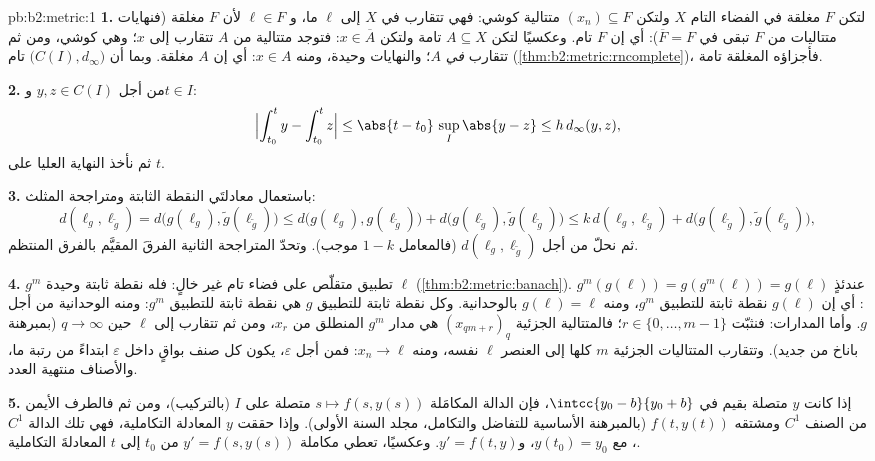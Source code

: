 \begin{solution}{pb:b2:metric:1}
\textbf{1.} لتكن $F$ مغلقة في الفضاء التام $X$ ولتكن $(x_n)
\subseteq F$ متتالية كوشي: فهي تتقارب في $X$ إلى $\ell$ ما، و
$\ell \in F$ لأن $F$ مغلقة (فنهايات متتاليات من $F$
تبقى في $\overline F = F$): أي إن $F$ تام. وعكسيًا لتكن $A
\subseteq X$ تامة ولتكن $x \in \overline A$: فتوجد متتالية
من $A$ تتقارب إلى $x$؛ وهي كوشي، ومن ثم تتقارب \emph{في}
$A$؛ والنهايات وحيدة، ومنه $x \in A$: أي إن $A$ مغلقة. وبما أن
$\bigl(C(I), d_\infty\bigr)$ تام
(\cref{thm:b2:metric:rncomplete})، فأجزاؤه المغلقة
تامة.

\textbf{2.} من أجل $y, z \in C(I)$ و$t \in I$:
\[
\Bigl|\int_{t_0}^{t}y - \int_{t_0}^{t}z\Bigr| \leq
\abs{t - t_0}\,\sup_I\abs{y - z} \leq h\,d_\infty(y, z),
\]
ثم نأخذ النهاية العليا على $t$.

\textbf{3.} باستعمال معادلتَي النقطة الثابتة ومتراجحة
المثلث:
\[
d(\ell_g, \ell_{\widetilde g})
= d\bigl(g(\ell_g), \widetilde g(\ell_{\widetilde g})\bigr)
\leq d\bigl(g(\ell_g), g(\ell_{\widetilde g})\bigr) +
d\bigl(g(\ell_{\widetilde g}), \widetilde g(\ell_{\widetilde
g})\bigr)
\leq k\,d(\ell_g, \ell_{\widetilde g}) +
d\bigl(g(\ell_{\widetilde g}), \widetilde g(\ell_{\widetilde
g})\bigr),
\]
ثم نحلّ من أجل $d(\ell_g, \ell_{\widetilde g})$ (فالمعامل
$1 - k$ موجب). وتحدّ المتراجحة الثانية الفرقَ المقيَّم
بالفرق المنتظم.

\textbf{4.} $g^m$ تطبيق متقلّص على فضاء تام غير خالٍ:
فله نقطة ثابتة وحيدة $\ell$
(\cref{thm:b2:metric:banach}). عندئذٍ $g^m(g(\ell)) =
g(g^m(\ell)) = g(\ell)$: أي إن $g(\ell)$ نقطة ثابتة للتطبيق $g^m$،
ومنه $g(\ell) = \ell$ بالوحدانية. وكل نقطة ثابتة للتطبيق $g$ هي نقطة ثابتة
للتطبيق $g^m$: ومنه الوحدانية من أجل $g$. وأما المدارات: فنثبّت $r \in \{0, \dots,
m-1\}$؛ فالمتتالية الجزئية $(x_{qm + r})_q$ هي مدار $g^m$
المنطلق من $x_r$، ومن ثم تتقارب إلى $\ell$ حين $q \to \infty$
(بمبرهنة باناخ من جديد). وتتقارب المتتاليات الجزئية $m$ كلها إلى العنصر
$\ell$ نفسه، ومنه $x_n \to \ell$: فمن أجل $\varepsilon$، يكون كل صنف بواقٍ
داخل $\varepsilon$ ابتداءً من رتبة ما، والأصناف منتهية
العدد.

\textbf{5.} إذا كانت $y$ متصلة بقيم في $\intcc{y_0 -
b}{y_0 + b}$، فإن الدالة المكامَلة $s \mapsto f(s, y(s))$ متصلة
على $I$ (بالتركيب)، ومن ثم فالطرف الأيمن من الصنف $C^1$ ومشتقه
$f(t, y(t))$ (بالمبرهنة الأساسية للتفاضل والتكامل، مجلد السنة
الأولى). وإذا حققت $y$ المعادلة التكاملية، فهي تلك الدالة
$C^1$، مع $y(t_0) = y_0$، و$y' = f(t, y)$. وعكسيًا،
تعطي مكاملة $y' = f(s, y(s))$ من $t_0$ إلى $t$
المعادلةَ التكاملية.


\end{solution}
